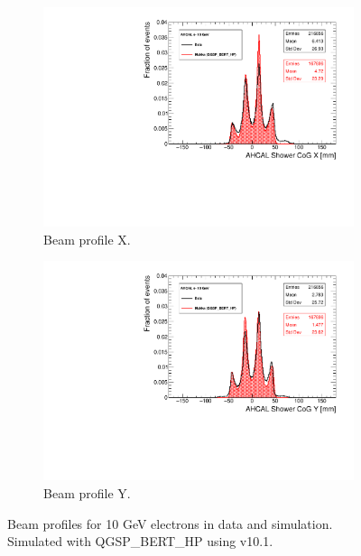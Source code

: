 \begin{figure}[htbp!]
	\centering
	\begin{subfigure}[t]{0.49\textwidth}
		\includegraphics[width=1.\linewidth]{../Thesis_Plots/Timing/Electrons/Plots/Run24542_CoGX_AHCAL_10GeV_Comparison.pdf}
		\caption{Beam profile X.} \label{fig:e10GeVX}
	\end{subfigure}
	\hfill
	\begin{subfigure}[t]{0.49\textwidth}
		\includegraphics[width=1.\linewidth]{../Thesis_Plots/Timing/Electrons/Plots/Run24542_CoGY_AHCAL_10GeV_Comparison.pdf}
		\caption{Beam profile Y.} \label{fig:e10GeVY}
	\end{subfigure}
	\caption{Beam profiles for 10 GeV electrons in data and simulation. Simulated with QGSP\_BERT\_HP using \geant v10.1.}
	\label{fig:BPe}
\end{figure}

